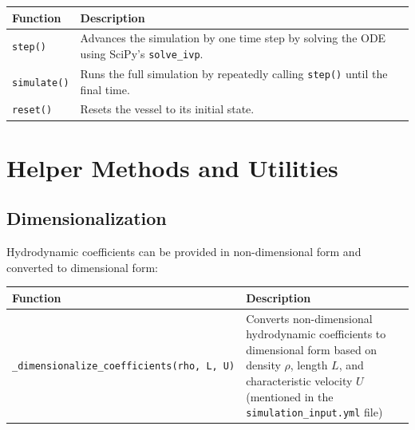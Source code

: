 \documentclass[
  letterpaper,
  DIV=11,
  numbers=noendperiod]{scrreprt}
\begin{document}
\begin{longtable}[]{@{}
  >{\raggedright\arraybackslash}p{}
  >{\raggedright\arraybackslash}p{}@{}}
\toprule\noalign{}
\begin{minipage}[b]{\linewidth}\raggedright
Function
\end{minipage} & \begin{minipage}[b]{\linewidth}\raggedright
Description
\end{minipage} \\
\midrule\noalign{}
\endhead
\bottomrule\noalign{}
\endlastfoot
\texttt{step()} & Advances the simulation by one time step by solving
the ODE using SciPy's \texttt{solve\_ivp}. \\
\texttt{simulate()} & Runs the full simulation by repeatedly calling
\texttt{step()} until the final time. \\
\texttt{reset()} & Resets the vessel to its initial state. \\
\end{longtable}

\section*{Helper Methods and
Utilities}\label{helper-methods-and-utilities}


\subsection*{Dimensionalization}\label{dimensionalization}

Hydrodynamic coefficients can be provided in non-dimensional form and
converted to dimensional form:

\begin{longtable}[]{@{}
  >{\raggedright\arraybackslash}p{}
  >{\raggedright\arraybackslash}p{}@{}}
\toprule\noalign{}
\begin{minipage}[b]{\linewidth}\raggedright
Function
\end{minipage} & \begin{minipage}[b]{\linewidth}\raggedright
Description
\end{minipage} \\
\midrule\noalign{}
\endhead
\bottomrule\noalign{}
\endlastfoot
\texttt{\_dimensionalize\_coefficients(rho,\ L,\ U)} & Converts
non-dimensional hydrodynamic coefficients to dimensional form based on
density \(\rho\), length \(L\), and characteristic velocity \(U\)
(mentioned in the \texttt{simulation\_input.yml} file) \\
\end{longtable}
\end{document}
